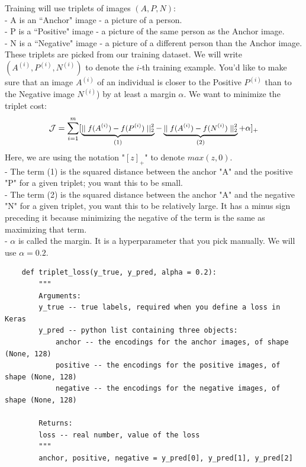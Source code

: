 \documentclass[11pt, a4paper]{article}
\begin{document}
\begin{spacing}{1.1}
	Training will use triplets of images $(A, P, N)$:  \\	
	- A is an ``Anchor" image - a picture of a person. \\
	- P is a ``Positive" image - a picture of the same person as the Anchor image. \\
	- N is a ``Negative" image - a picture of a different person than the Anchor image. \vspace*{1mm} \\
	These triplets are picked from our training dataset. We will write $(A^{(i)}, P^{(i)}, N^{(i)})$ to denote the $i$-th training example. You'd like to make sure that an image $A^{(i)}$ of an individual is closer to the Positive $P^{(i)}$ than to the Negative image $N^{(i)}$) by at least a margin $\alpha$. We want to minimize the triplet cost: 
	$$\mathcal{J} = \sum^{m}_{i=1} \large[ \small \underbrace{\mid \mid f(A^{(i)}) - f(P^{(i)}) \mid \mid_2^2}_\text{(1)} - \underbrace{\mid \mid f(A^{(i)}) - f(N^{(i)}) \mid \mid_2^2}_\text{(2)} + \alpha \large ] \small_+$$
	Here, we are using the notation "$[z]_+$" to denote $max(z,0)$. \vspace*{1mm}\\
	- The term (1) is the squared distance between the anchor "A" and the positive "P" for a given triplet; \hspace*{2mm} you want this to be small. \\
	- The term (2) is the squared distance between the anchor "A" and the negative "N" for a given triplet, \hspace*{2mm} you want this to be relatively large. It has a minus sign preceding it because minimizing the negative \hspace*{2mm} of the term is the same as maximizing that term. \\
	- $\alpha$ is called the margin. It is a hyperparameter that you pick manually. We will use $\alpha = 0.2$. \newpage

	\begin{lstlisting}
	def triplet_loss(y_true, y_pred, alpha = 0.2):
		"""
		Arguments:
		y_true -- true labels, required when you define a loss in Keras
		y_pred -- python list containing three objects:
			anchor -- the encodings for the anchor images, of shape (None, 128)
			positive -- the encodings for the positive images, of shape (None, 128)
			negative -- the encodings for the negative images, of shape (None, 128)
		
		Returns:
		loss -- real number, value of the loss
		"""
		anchor, positive, negative = y_pred[0], y_pred[1], y_pred[2]
		

\end{lstlisting}
\end{spacing}
\end{document}
